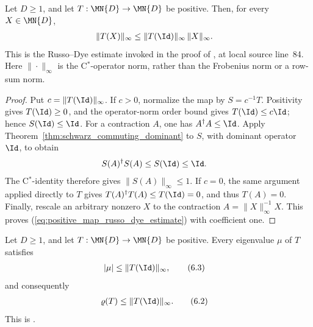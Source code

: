 \begin{theorem}
    \label{thm:positive_map_russo_dye_estimate}
    \leanok
    Let $D\geq1$, and let $T:\MN{D}\to\MN{D}$ be positive. Then, for every
    $X\in\MN{D}$,
    \begin{align}
        \|T(X)\|_\infty
        &\leq \|T(\Id)\|_\infty\,\|X\|_\infty.
        \label{eq:positive_map_russo_dye_estimate}
    \end{align}
    This is the Russo--Dye estimate invoked in the proof of
    \cite[Proposition~6.1]{Wolf2012Quantum}, at local source line~84. Here
    $\|\cdot\|_\infty$ is the C$^*$-operator norm, rather than the Frobenius
    norm or a row-sum norm.
\end{theorem}

\begin{proof}\leanok
    Put $c=\|T(\Id)\|_\infty$. If $c>0$, normalize the map by
    $S=c^{-1}T$. Positivity gives $T(\Id)\geq0$, and the operator-norm order
    bound gives $T(\Id)\leq c\Id$; hence $S(\Id)\leq\Id$.
    For a contraction $A$, one has $A^\dagger A\leq\Id$. Apply
    Theorem~\ref{thm:schwarz_commuting_dominant} to $S$, with dominant
    operator $\Id$, to obtain
    \begin{align}
        S(A)^\dagger S(A)
        &\leq S(\Id)\leq\Id.
        \notag
    \end{align}
    The C$^*$-identity therefore gives $\|S(A)\|_\infty\leq1$.
    If $c=0$, the same argument applied directly to $T$ gives
    $T(A)^\dagger T(A)\leq T(\Id)=0$, and thus $T(A)=0$. Finally, rescale
    an arbitrary nonzero $X$ to the contraction
    $A=\|X\|_\infty^{-1}X$. This proves
    (\ref{eq:positive_map_russo_dye_estimate}) with coefficient one.
\end{proof}

\begin{theorem}
    \label{thm:positive_map_spectral_radius_bound}
    \leanok
    Let $D\geq1$, and let $T:\MN{D}\to\MN{D}$ be positive. Every eigenvalue
    $\mu$ of $T$ satisfies
    \begin{align}
        |\mu|&\leq\|T(\Id)\|_\infty,
        \tag{6.3}
    \end{align}
    and consequently
    \begin{align}
        \varrho(T)&\leq\|T(\Id)\|_\infty.
        \tag{6.2}
    \end{align}
    This is \cite[Proposition~6.1]{Wolf2012Quantum}.
\end{theorem}

